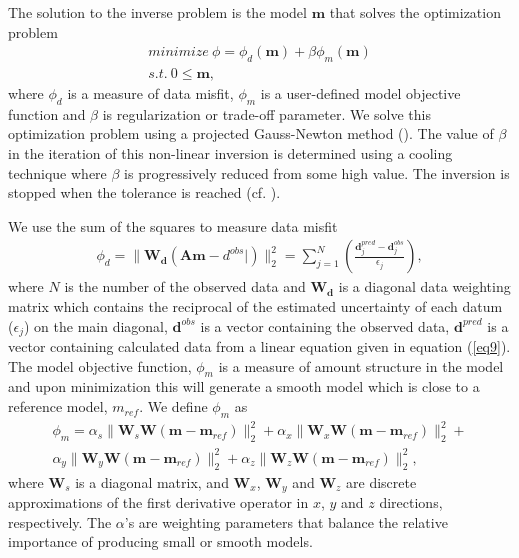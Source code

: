 \documentclass[a4paper, 11pt]{article}
\begin{document}
The solution to the inverse problem is the model $\mathbf{m}$ that solves the optimization problem
\begin{eqnarray}
  minimize \ \phi =  \phi_d(\mathbf{m}) + \beta\phi_m(\mathbf{m})\nonumber \\
  s.t. \ 0 \le \mathbf{m},
  \label{eq10}
\end{eqnarray}
where $\phi_d$ is a measure of data misfit, $\phi_m$ is a user-defined model objective function and $\beta$ is regularization or trade-off parameter. We solve this optimization problem using a projected Gauss-Newton method (\cite{Kelley}). 
The value of $\beta$ in the iteration of this non-linear inversion is determined using a cooling technique where $\beta$ is progressively reduced from some high value. The inversion is stopped when the tolerance is reached (cf. \cite{DougTutorial, Kang2014}). 

We use the sum of the squares to measure data misfit
\begin{eqnarray}
  \phi_d = \| \mathbf{W_d}(\mathbf{A}\mathbf{m}-d^{obs}|)\|^2_2 =
  \sum^N_{j=1}(\frac{\mathbf{d}^{pred}_j-\mathbf{d}^{obs}_j}{\epsilon_j}),
  \label{eq11}
\end{eqnarray}
where $N$ is the number of the observed data and $\mathbf{W_d}$ is a diagonal data weighting matrix which contains the reciprocal of the estimated uncertainty of each datum ($\epsilon_j$) on the main diagonal,  $\mathbf{d}^{obs}$ is a vector containing the observed data, $\mathbf{d}^{pred}$ is a vector containing calculated data from a linear equation given in equation (\ref{eq9}).
The model objective function, $\phi_m$ is a measure of amount structure in the model and upon minimization this will generate a smooth model which is close to a reference model, $m_{ref}$. 
We define $\phi_m$ as
\begin{eqnarray}
  \phi_m = \alpha_s\| \mathbf{W}_s\mathbf{W}(\mathbf{m}-\mathbf{m}_{ref})\|^2_2+
       \alpha_x\| \mathbf{W}_x\mathbf{W}(\mathbf{m}-\mathbf{m}_{ref})\|^2_2+ \nonumber \\
       \alpha_y\| \mathbf{W}_y\mathbf{W}(\mathbf{m}-\mathbf{m}_{ref})\|^2_2+
       \alpha_z\| \mathbf{W}_z\mathbf{W}(\mathbf{m}-\mathbf{m}_{ref})\|^2_2,
  \label{eq12}
\end{eqnarray}
where $\mathbf{W}_s$ is a diagonal matrix, and $\mathbf{W}_x$, $\mathbf{W}_y$ and $\mathbf{W}_z$ are discrete approximations of the first derivative operator in $x$, $y$ and $z$ directions, respectively.  
The $\alpha$'s are weighting parameters that balance the relative importance of producing small or smooth models.
\end{document}
